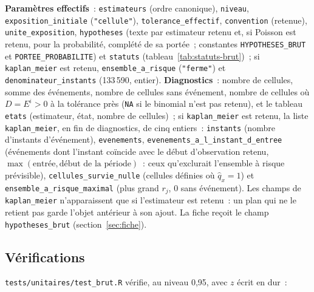 \documentclass[a4paper,11pt]{article}
\newcommand{\code}[1]{\texttt{\small #1}}
\begin{document}
\noindent
\textbf{Paramètres effectifs}~: \code{estimateurs} (ordre canonique),
\code{niveau}, \code{exposition\_initiale} (\code{"cellule"}),
\code{tolerance\_effectif}, \code{convention} (retenue), \code{unite\_exposition},
\code{hypotheses} (texte par estimateur retenu et, si Poisson est retenu,
pour la probabilité, complété de sa portée~; constantes
\code{HYPOTHESES\_BRUT} et \code{PORTEE\_PROBABILITE}) et \code{statuts}
(tableau~\ref{tab:statuts-brut})~; si \code{kaplan\_meier} est retenu,
\code{ensemble\_a\_risque} (\code{"ferme"}) et \code{denominateur\_instants}
(133\,590, entier). \textbf{Diagnostics}~: nombre de cellules,
somme des événements, nombre de cellules sans événement, nombre de cellules
où $D = E^i > 0$ à la tolérance près (\code{NA} si le binomial n'est pas
retenu), et le tableau \code{etats} (estimateur, état, nombre de cellules)~;
si \code{kaplan\_meier} est retenu, la liste \code{kaplan\_meier}, en fin de
diagnostics, de cinq entiers~: \code{instants} (nombre d'instants
d'événement), \code{evenements}, \code{evenements\_a\_l\_instant\_d\_entree}
(événements dont l'instant coïncide avec le début d'observation retenu,
$\max(\text{entrée}, \text{début de la période})$~: ceux qu'exclurait
l'ensemble à risque prévisible), \code{cellules\_survie\_nulle} (cellules
définies où $\hat q_x = 1$) et \code{ensemble\_a\_risque\_maximal} (plus
grand $r_j$, 0 sans événement). Les champs de \code{kaplan\_meier}
n'apparaissent que si l'estimateur est retenu~: un plan qui ne le retient pas
garde l'objet antérieur à son ajout. La fiche reçoit le champ
\code{hypotheses\_brut} (section~\ref{sec:fiche}).

\subsection{Vérifications}
\label{sec:verifications-brut}

\code{tests/unitaires/test\_brut.R} vérifie, au niveau 0,95, avec $z$ écrit
en dur~:
\end{document}
